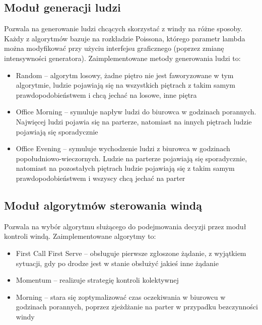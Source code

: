 \documentclass[a4paper,11pt]{article}
\begin{document}
\subsection{Moduł generacji ludzi}
Pozwala na generowanie ludzi chcących skorzystać z windy na różne sposoby. Każdy z algorytmów bazuje na rozkładzie Poissona, którego parametr lambda można modyfikować przy użyciu interfejsu graficznego (poprzez zmianę intensywności generatora). Zaimplementowane metody generowania ludzi to:
\begin{itemize}
	\item Random -- algorytm losowy, żadne piętro nie jest faworyzowane w tym algorytmie, ludzie pojawiają się na wszystkich piętrach z takim samym prawdopodobieństwem i chcą jechać na losowe, inne piętra
	\item Office Morning -- symuluje napływ ludzi do biurowca w godzinach porannych. Najwięcej ludzi pojawia się na parterze, natomiast na innych piętrach ludzie pojawiają się sporadycznie
	\item Office Evening -- symuluje wychodzenie ludzi z biurowca w godzinach popołudniowo-wieczornych. Ludzie na parterze pojawiają się sporadycznie, natomiast na pozostałych piętrach ludzie pojawiają się z takim samym prawdopodobieństwem i wszyscy chcą jechać na parter
\end{itemize}
\subsection{Moduł algorytmów sterowania windą}
Pozwala na wybór algorytmu służącego do podejmowania decyzji przez moduł kontroli windą. Zaimplementowane algorytmy to:
\begin{itemize}
	\item First Call First Serve -- obsługuje pierwsze zgłoszone żądanie, z wyjątkiem sytuacji, gdy po drodze jest w stanie obsłużyć jakieś inne żądanie
	\item Momentum -- realizuje strategię kontroli kolektywnej
	\item Morning -- stara się zoptymalizować czas oczekiwania w biurowcu w godzinach porannych, poprzez zjeżdżanie na parter w przypadku bezczynności windy
\end{itemize}
\end{document}
